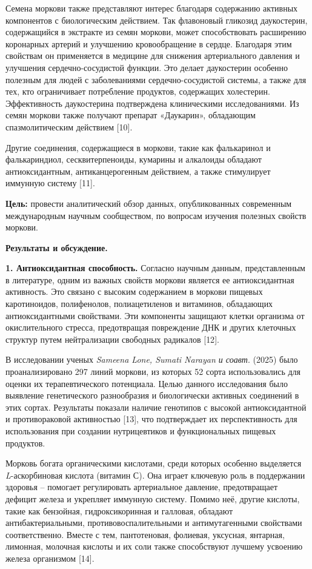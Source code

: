 Семена моркови также представляют интерес благодаря содержанию активных
компонентов с биологическим действием. Так флавоновый гликозид
даукостерин, содержащийся в экстракте из семян моркови, может
способствовать расширению коронарных артерий и улучшению кровообращение
в сердце. Благодаря этим свойствам он применяется в медицине для
снижения артериального давления и улучшения сердечно-сосудистой функции.
Это делает даукостерин особенно полезным для людей с заболеваниями
сердечно-сосудистой системы, а также для тех, кто ограничивает
потребление продуктов, содержащих холестерин. Эффективность даукостерина
подтверждена клиническими исследованиями. Из семян моркови также
получают препарат «Даукарин», обладающим спазмолитическим действием
{[}10{]}.

Другие соединения, содержащиеся в моркови, такие как фалькаринол и
фалькариндиол, сесквитерпеноиды, кумарины и алкалоиды обладают
антиоксидантным, антиканцерогенным действием, а также стимулирует
иммунную систему {[}11{]}.

{\bfseries Цель:} провести аналитический обзор данных, опубликованных
современным международным научным сообществом, по вопросам изучения
полезных свойств моркови.

{\bfseries Результаты и обсуждение.}

{\bfseries 1. Антиоксидантная способность.} Согласно научным данным,
представленным в литературе, одним из важных свойств моркови является ее
антиоксидантная активность. Это связано с высоким содержанием в моркови
пищевых каротиноидов, полифенолов, полиацетиленов и витаминов,
обладающих антиоксидантными свойствами. Эти компоненты защищают клетки
организма от окислительного стресса, предотвращая повреждение ДНК и
других клеточных структур путем нейтрализации свободных радикалов
{[}12{]}.

В исследовании ученых \emph{Sameena Lone, Sumati Narayan и соавт}.
(2025) было проанализировано 297 линий моркови, из которых 52 сорта
использовались для оценки их терапевтического потенциала. Целью данного
исследования было выявление генетического разнообразия и биологически
активных соединений в этих сортах. Результаты показали наличие генотипов
с высокой антиоксидантной и противораковой активностью {[}13{]}, что
подтверждает их перспективность для использования при создании
нутрицевтиков и функциональных пищевых продуктов.

Морковь богата органическими кислотами, среди которых особенно
выделяется \emph{L}-аскорбиновая кислота (витамин С). Она играет
ключевую роль в поддержании здоровья -- помогает регулировать
артериальное давление, предотвращает дефицит железа и укрепляет иммунную
систему. Помимо неё, другие кислоты, такие как бензойная,
гидроксикоринная и галловая, обладают антибактериальными,
противовоспалительными и антимутагенными свойствами соответственно.
Вместе с тем, пантотеновая, фолиевая, уксусная, янтарная, лимонная,
молочная кислоты и их соли также способствуют лучшему усвоению железа
организмом {[}14{]}.


